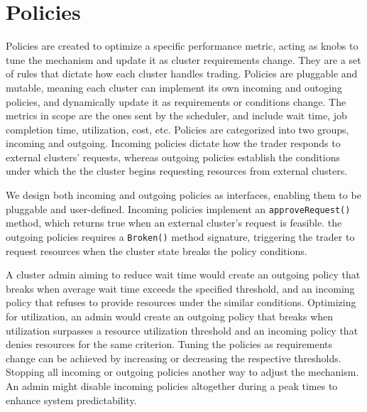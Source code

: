 



\section{Policies}

Policies are created to optimize a specific performance metric, acting as knobs
to tune the mechanism and update it as cluster requirements change. They are a
set of rules that dictate how each cluster handles trading. Policies are
pluggable and mutable, meaning each cluster can implement its own incoming and
outoging policies, and dynamically update it as requirements or conditions
change. The metrics in scope are the ones sent by the scheduler, and include
wait time, job completion time, utilization, cost, etc. Policies are
categorized into two groups, incoming and outgoing. Incoming policies dictate
how the trader responds to external clusters' requests, whereas outgoing
policies establish the conditions under which the the cluster begins requesting
resources from external clusters.

We design both incoming and outgoing policies as interfaces, enabling them to
be pluggable and user-defined. Incoming policies implement an
\texttt{approveRequest()} method, which returns true when an external cluster's
request is feasible. the outgoing policies requires a \texttt{Broken()} method
signature, triggering the trader to request resources when the cluster state
breaks the policy conditions.  

A cluster admin aiming to reduce wait time would create an outgoing policy that
breaks when average wait time exceeds the specified threshold, and an incoming
policy that refuses to provide resources under the similar conditions.
Optimizing for utilization, an admin would create an outgoing policy that
breaks when utilization surpasses a resource utilization threshold and an
incoming policy that denies resources for the same criterion. Tuning the
policies as requirements change can be achieved by increasing or decreasing the
respective thresholds. Stopping all incoming or outgoing policies another way
to adjust the mechanism. An admin might disable incoming policies altogether
during a peak times to enhance system predictability. 

